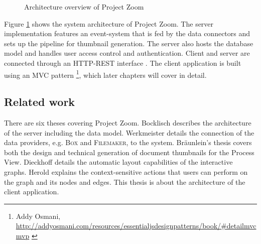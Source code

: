 \begin{figure}
\caption{Architecture overview of Project Zoom}
\label{fig:CompleteArchitectureDiagram}
\end{figure}

Figure \ref{fig:CompleteArchitectureDiagram} shows the system architecture of Project Zoom. The server implementation features an event-system that is fed by the data connectors and sets up the pipeline for thumbnail generation. The server also hosts the database model and handles user access control and authentication. Client and server are connected through an HTTP-REST interface \cite{Fielding_2000}. The client application is built using an MVC pattern \footnote{Addy Osmani, \url{http://addyosmani.com/resources/essentialjsdesignpatterns/book/\#detailmvcmvp} \cite{Osmani_2012}}, which later chapters will cover in detail. 

\subsection{Related work}
There are six theses covering Project Zoom. Bocklisch \cite{Bocklisch_2013} describes the architecture of the server including the data model. Werkmeister \cite{Werkmeister_2013} details the connection of the data providers, e.g. \textsc{Box} and \textsc{Filemaker}, to the system. Bräunlein's thesis \cite{Braeunlein_2013} covers both the design and technical generation of document thumbnails for the Process View. Dieckhoff \cite{Dieckhoff_2013} details the automatic layout capabilities of the interactive graphs. Herold \cite{Herold_2013} explains the context-sensitive actions that users can perform on the graph and its nodes and edges. This thesis is about the architecture of the client application. 